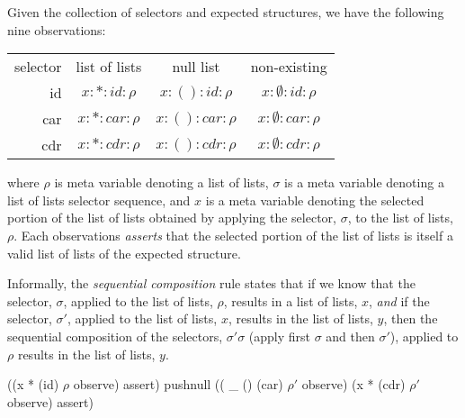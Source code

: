 \documentclass[a4paper,openany]{amsart}
\begin{document}
Given the collection of selectors and expected structures, we have the following
nine observations:
%
\vspace{1ex}\begin{center}\begin{tabular}{rccc}
selector & list of lists    &    null list       &   non-existing \\
id       & $x : * : id  : \rho$ & $x : ( ) : id  : \rho$ & $x : \emptyset : id  : \rho$ \\
car      & $x : * : car : \rho$ & $x : ( ) : car : \rho$ & $x : \emptyset : car : \rho$ \\
cdr      & $x : * : cdr : \rho$ & $x : ( ) : cdr : \rho$ & $x : \emptyset : cdr : \rho$
\end{tabular}\end{center}\vspace{1ex}
%
where $\rho$ is meta variable denoting a list of lists, $\sigma$ is a meta
variable denoting a list of lists selector sequence, and $x$ is a meta variable
denoting the selected portion of the list of lists obtained by applying the
selector, $\sigma$, to the list of lists, $\rho$. Each observations
\emph{asserts} that the selected portion of the list of lists is itself a valid
list of lists of the expected structure.

\begin{prooftree}
\end{prooftree}

Informally, the \emph{sequential composition} rule states that if we know that
the selector, $\sigma$, applied to the list of lists, $\rho$, results in a list
of lists, $x$, \emph{and} if the selector, $\sigma'$, applied to the list of
lists, $x$, results in the list of lists, $y$, then the sequential composition
of the selectors, $\sigma' \sigma$ (apply first $\sigma$ and then $\sigma'$),
applied to $\rho$ results in the list of lists, $y$.

\begin{prooftree}
\end{prooftree}

\begin{joyLoL}
((x * (id) $\rho$ observe) assert)
pushnull
(( _ () (car) $\rho'$ observe) (x * (cdr) $\rho'$ observe) assert)
\end{joyLoL}
\end{document}
